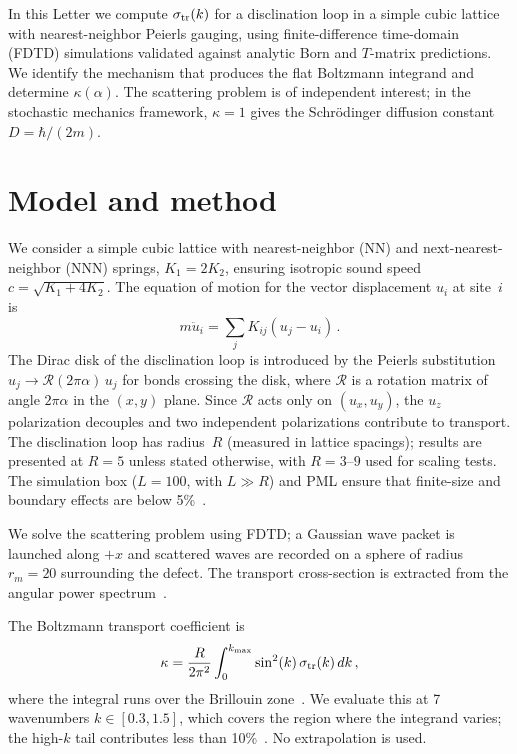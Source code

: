 \documentclass[aps,prl,twocolumn,superscriptaddress]{revtex4-2}
\begin{document}
In this Letter we compute $\sigma_{\rm tr}(k)$ for a disclination loop in a
simple cubic lattice with nearest-neighbor Peierls gauging, using
finite-difference time-domain (FDTD) simulations validated against analytic
Born and $T$-matrix predictions. We identify the mechanism that produces the
flat Boltzmann integrand and determine $\kappa(\alpha)$. The scattering
problem is of independent interest; in the stochastic mechanics framework,
$\kappa = 1$ gives the Schr\"odinger diffusion constant
$D = \hbar/(2m)$.

\section{Model and method}

We consider a simple cubic lattice with nearest-neighbor (NN) and
next-nearest-neighbor (NNN) springs, $K_1 = 2K_2$, ensuring isotropic sound
speed $c = \sqrt{K_1 + 4K_2}$. The equation of motion for the vector
displacement $u_i$ at site~$i$ is
%
\begin{equation}
m\ddot{u}_i = \sum_j K_{ij}(u_j - u_i) \,.
\label{eq:eom}
\end{equation}
%
The Dirac disk of the disclination loop is introduced by the Peierls
substitution~\cite{peierls1933} $u_j \to \mathcal{R}(2\pi\alpha)\,u_j$
for bonds crossing the disk, where $\mathcal{R}$ is a rotation matrix of
angle $2\pi\alpha$ in the $(x,y)$ plane. Since $\mathcal{R}$ acts only on
$(u_x, u_y)$, the $u_z$ polarization decouples and two independent
polarizations contribute to transport. The disclination loop has radius~$R$
(measured in lattice spacings); results are presented at $R = 5$ unless
stated otherwise, with $R = 3$--$9$ used for scaling tests. The simulation
box ($L = 100$, with $L \gg R$) and PML ensure that finite-size and boundary
effects are below 5\%~\cite{sm}.

We solve the scattering problem using FDTD; a Gaussian wave packet is
launched along $+x$ and scattered waves are recorded on a sphere of radius
$r_m = 20$ surrounding the defect. The transport cross-section is extracted
from the angular power spectrum~\cite{sm}.

The Boltzmann transport coefficient is
%
\begin{equation}
\kappa = \frac{R}{2\pi^2} \int_0^{k_{\rm max}}
  \sin^2(k)\,\sigma_{\rm tr}(k)\,dk \,,
\label{eq:kappa}
\end{equation}
%
where the integral runs over the Brillouin zone~\cite{sm}. We evaluate
this at 7 wavenumbers $k \in [0.3, 1.5]$, which covers the region where the
integrand varies; the high-$k$ tail contributes less than 10\%~\cite{sm}.
No extrapolation is used.
\end{document}
